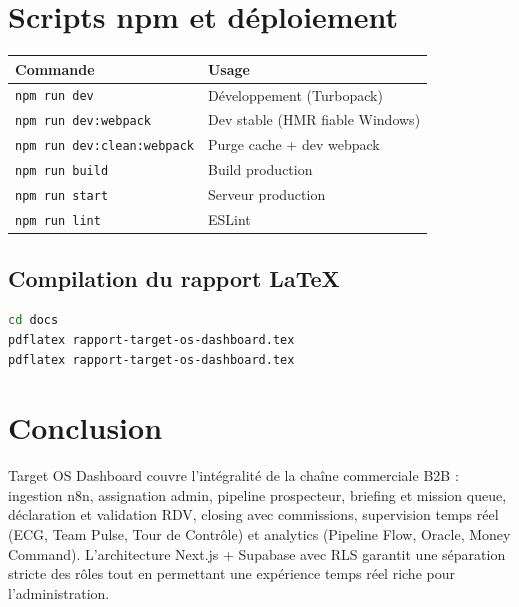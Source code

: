 \documentclass[11pt,a4paper]{report}
\begin{document}
\chapter{Scripts npm et déploiement}

\begin{table}[h]
\centering
\begin{tabular}{@{}ll@{}}
\toprule
\textbf{Commande} & \textbf{Usage} \\
\midrule
\texttt{npm run dev} & Développement (Turbopack) \\
\texttt{npm run dev:webpack} & Dev stable (HMR fiable Windows) \\
\texttt{npm run dev:clean:webpack} & Purge cache + dev webpack \\
\texttt{npm run build} & Build production \\
\texttt{npm run start} & Serveur production \\
\texttt{npm run lint} & ESLint \\
\bottomrule
\end{tabular}
\end{table}

\section{Compilation du rapport LaTeX}

\begin{lstlisting}[language=bash]
cd docs
pdflatex rapport-target-os-dashboard.tex
pdflatex rapport-target-os-dashboard.tex
\end{lstlisting}

\chapter*{Conclusion}

Target OS Dashboard couvre l'intégralité de la chaîne commerciale B2B : ingestion n8n, assignation admin, pipeline prospecteur, briefing et mission queue, déclaration et validation RDV, closing avec commissions, supervision temps réel (ECG, Team Pulse, Tour de Contrôle) et analytics (Pipeline Flow, Oracle, Money Command). L'architecture Next.js + Supabase avec RLS garantit une séparation stricte des rôles tout en permettant une expérience temps réel riche pour l'administration.
\end{document}
